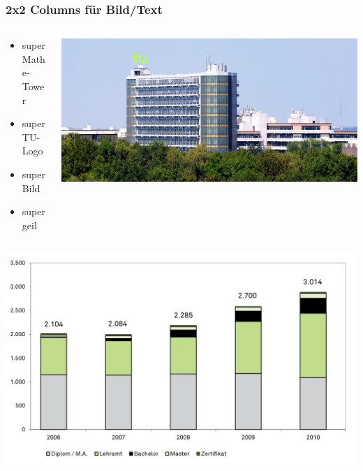\documentclass{beamer}
\begin{document}
\begin{frame}
    \frametitle{2x2 Columns für Bild/Text}
    \begin{columns}[T]
        \begin{column}{0.5\textwidth}
            \begin{itemize}%
                \item super Mathe-Tower
                \item super TU-Logo
                \item super Bild
                \item super geil
            \end{itemize}
        \end{column}
        \begin{column}{0.5\textwidth}
            \includegraphics[width=\textwidth]{./Title-Pic.jpg}
        \end{column}
    \end{columns}
    \vspace{5pt}
    \begin{columns}[T]
        \begin{column}{0.5\textwidth}
            \includegraphics[width=\textwidth]{./image23.jpg}

\end{column}
\end{columns}
\end{frame}
\end{document}
